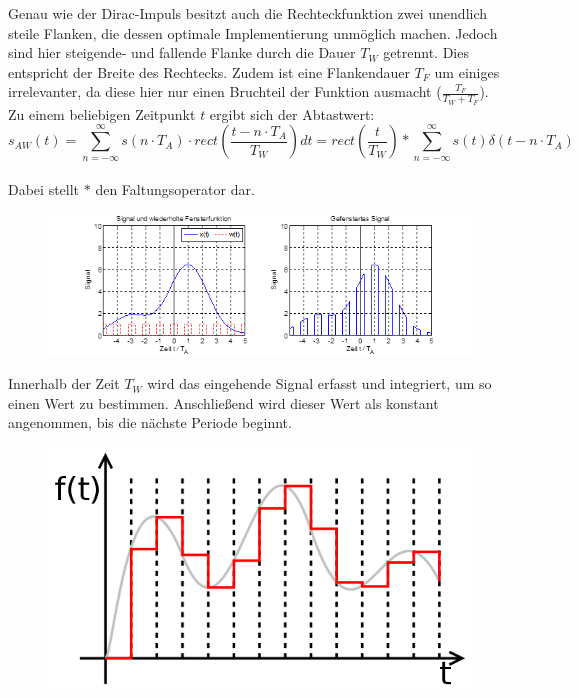 Genau wie der Dirac-Impuls besitzt auch die Rechteckfunktion zwei unendlich steile Flanken, die dessen optimale Implementierung unmöglich machen. Jedoch sind hier steigende- und fallende Flanke durch die Dauer $T_W$ getrennt. Dies entspricht der Breite des Rechtecks. Zudem ist eine Flankendauer $T_F$  um einiges irrelevanter, da diese hier nur einen Bruchteil der Funktion ausmacht ($\frac{T_F}{T_W + T_F}$). \\
\newline
Zu einem beliebigen Zeitpunkt $t$ ergibt sich der Abtastwert:\\
$$s_{AW}(t) = \sum_{n=-\infty}^{\infty} s(n\cdot T_A) \cdot rect\left( \frac{t - n \cdot T_A}{T_W}\right) dt 
= rect\left(\frac{t}{T_W}\right) * \sum_{n=-\infty}^{\infty} s(t) \delta (t - n\cdot T_A)$$ \\
Dabei stellt $*$ den Faltungsoperator dar.

\begin{figure}[h!]
\centering
\includegraphics[scale=1]{images/abtastung_real.png}
\label{real_abtastung}
\end{figure}

Innerhalb der Zeit $T_W$ wird das eingehende Signal erfasst und integriert, um so einen Wert zu bestimmen. Anschließend wird dieser Wert als konstant angenommen, bis die nächste Periode beginnt. 

\begin{figure}[h!]
\centering
\includegraphics[scale=0.4]{images/sah_signal.png}
\label{sah_signal}
\end{figure}

